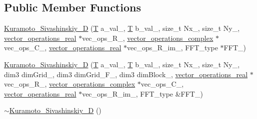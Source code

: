 \subsection*{Public Member Functions}
\begin{DoxyCompactItemize}
\item 
\hyperlink{classnonlinear__operators_1_1Kuramoto__Sivashinskiy__2D_aaf3584292096247bff98efd0979c1287}{Kuramoto\-\_\-\-Sivashinskiy\-\_\-D} (\hyperlink{classnonlinear__operators_1_1Kuramoto__Sivashinskiy__2D_a108220178ea58555cba481a0c8960404}{T} a\-\_\-val\-\_\-, \hyperlink{classnonlinear__operators_1_1Kuramoto__Sivashinskiy__2D_a108220178ea58555cba481a0c8960404}{T} b\-\_\-val\-\_\-, size\-\_\-t Nx\-\_\-, size\-\_\-t Ny\-\_\-, \hyperlink{classnonlinear__operators_1_1Kuramoto__Sivashinskiy__2D_aeb1b50af221ad1f1ae0e8e945de23572}{vector\-\_\-operations\-\_\-real} $\ast$vec\-\_\-ops\-\_\-\-R\-\_\-, \hyperlink{classnonlinear__operators_1_1Kuramoto__Sivashinskiy__2D_a4868b14c92e357e368f38f421bd36a08}{vector\-\_\-operations\-\_\-complex} $\ast$vec\-\_\-ops\-\_\-\-C\-\_\-, \hyperlink{classnonlinear__operators_1_1Kuramoto__Sivashinskiy__2D_aeb1b50af221ad1f1ae0e8e945de23572}{vector\-\_\-operations\-\_\-real} $\ast$vec\-\_\-ops\-\_\-\-R\-\_\-im\-\_\-, F\-F\-T\-\_\-type $\ast$F\-F\-T\-\_\-)
\item 
\hyperlink{classnonlinear__operators_1_1Kuramoto__Sivashinskiy__2D_a39df5ca99d9ef92ecb3cd60785527d1d}{Kuramoto\-\_\-\-Sivashinskiy\-\_\-D} (\hyperlink{classnonlinear__operators_1_1Kuramoto__Sivashinskiy__2D_a108220178ea58555cba481a0c8960404}{T} a\-\_\-val\-\_\-, \hyperlink{classnonlinear__operators_1_1Kuramoto__Sivashinskiy__2D_a108220178ea58555cba481a0c8960404}{T} b\-\_\-val\-\_\-, size\-\_\-t Nx\-\_\-, size\-\_\-t Ny\-\_\-, dim3 dim\-Grid\-\_\-, dim3 dim\-Grid\-\_\-\-F\-\_\-, dim3 dim\-Block\-\_\-, \hyperlink{classnonlinear__operators_1_1Kuramoto__Sivashinskiy__2D_aeb1b50af221ad1f1ae0e8e945de23572}{vector\-\_\-operations\-\_\-real} $\ast$vec\-\_\-ops\-\_\-\-R\-\_\-, \hyperlink{classnonlinear__operators_1_1Kuramoto__Sivashinskiy__2D_a4868b14c92e357e368f38f421bd36a08}{vector\-\_\-operations\-\_\-complex} $\ast$vec\-\_\-ops\-\_\-\-C\-\_\-, \hyperlink{classnonlinear__operators_1_1Kuramoto__Sivashinskiy__2D_aeb1b50af221ad1f1ae0e8e945de23572}{vector\-\_\-operations\-\_\-real} $\ast$vec\-\_\-ops\-\_\-\-R\-\_\-im\-\_\-, F\-F\-T\-\_\-type \&F\-F\-T\-\_\-)
\item 
\hyperlink{classnonlinear__operators_1_1Kuramoto__Sivashinskiy__2D_a495a8fa56ed05edd7657445429204666}{$\sim$\-Kuramoto\-\_\-\-Sivashinskiy\-\_\-D} ()

\end{DoxyCompactItemize}
